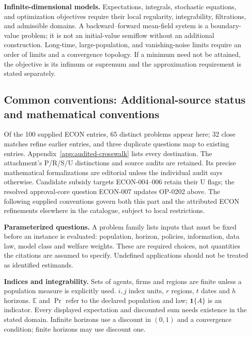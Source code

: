 \documentclass[11pt,a4paper]{article}
\begin{document}
\textbf{Infinite-dimensional models.} Expectations, integrals, stochastic
equations, and optimization objectives require their local regularity,
integrability, filtrations, and admissible domains. A backward--forward
mean-field system is a boundary-value problem; it is not an initial-value
semiflow without an additional construction. Long-time, large-population,
and vanishing-noise limits require an order of limits and a convergence
topology. If a minimum need not be attained, the objective is its infimum
or supremum and the approximation requirement is stated separately.

\subsection*{Common conventions: Additional-source status and mathematical conventions}

\label{audited:conventions}

Of the 100 supplied ECON entries, 65 distinct problems appear here; 32 close
matches refine earlier entries, and three duplicate questions map to existing
entries. Appendix~\ref{app:audited-crosswalk} lists every destination.
The attachment's P/R/S/U distinctions and source audits are retained. Its
precise mathematical formalizations are editorial unless the individual audit
says otherwise. Candidate subsidy targets ECON-004--006 retain their U flags;
the resolved approval-core question ECON-007 updates OP-0202 above.
The following supplied conventions govern both this part and the attributed
ECON refinements elsewhere in the catalogue, subject to local restrictions.

\textbf{Parameterized questions.} A problem family lists inputs that must be fixed before an instance is evaluated: population, horizon, policies, information, data law, model class and welfare weights. These are required choices, not quantities the citations are assumed to specify. Undefined applications should not be treated as identified estimands.

\textbf{Indices and integrability.} Sets of agents, firms and regions are finite unless a population measure is explicitly used. \(i,j\) index units, \(r\) regions, \(t\) dates and \(h\) horizons. \(\mathbb E\) and \(\Pr\) refer to the declared population and law; \(\mathbf1\{A\}\) is an indicator. Every displayed expectation and discounted sum needs existence in the stated domain. Infinite horizons use a discount in \((0,1)\) and a convergence condition; finite horizons may use discount one.
\end{document}
